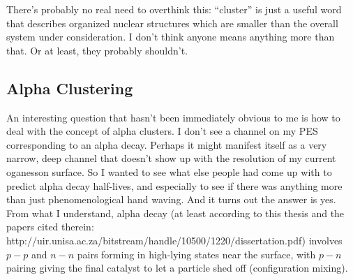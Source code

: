 There's probably no real need to overthink this: ``cluster'' is just a useful word that describes organized nuclear structures which are smaller than the overall system under consideration. I don't think anyone means anything more than that. Or at least, they probably shouldn't.

\subsection*{Alpha Clustering}
An interesting question that hasn't been immediately obvious to me is how to deal with the concept of alpha clusters. I don't see a channel on my PES corresponding to an alpha decay. Perhaps it might manifest itself as a very narrow, deep channel that doesn't show up with the resolution of my current oganesson surface. So I wanted to see what else people had come up with to predict alpha decay half-lives, and especially to see if there was anything more than just phenomenological hand waving. And it turns out the answer is yes. From what I understand, alpha decay (at least according to this thesis and the papers cited therein: http://uir.unisa.ac.za/bitstream/handle/10500/1220/dissertation.pdf) involves $p-p$ and $n-n$ pairs forming in high-lying states near the surface, with $p-n$ pairing giving the final catalyst to let a particle shed off (configuration mixing).
